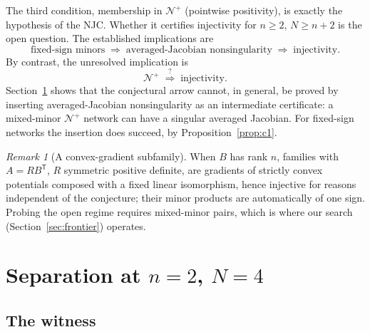 \documentclass[11pt]{article}
\theoremstyle{definition}
\theoremstyle{remark}
\newtheorem{remark}[theorem]{Remark}
\begin{document}
The third condition, membership in $\mathcal N^{+}$ (pointwise
positivity), is exactly the hypothesis of the NJC. Whether it certifies
injectivity for $n\ge2$, $N\ge n+2$ is the open question. The established
implications are
\[
\text{fixed-sign minors}
\;\Longrightarrow\;
\text{averaged-Jacobian nonsingularity}
\;\Longrightarrow\;
\text{injectivity}.
\]
By contrast, the unresolved implication is
\[
\mathcal N^{+}\;\overset{?}{\Longrightarrow}\;\text{injectivity}.
\]
Section~\ref{sec:witness} shows that the conjectural arrow cannot, in
general, be proved by inserting averaged-Jacobian nonsingularity as an
intermediate certificate: a mixed-minor $\mathcal N^{+}$ network can have
a singular averaged Jacobian. For fixed-sign networks the insertion does
succeed, by Proposition~\ref{prop:c1}.

\begin{remark}[A convex-gradient subfamily]\label{rem:gradient}
When $B$ has rank $n$, families with $A=RB^{\mathsf T}$, $R$ symmetric
positive definite, are
gradients of strictly convex potentials composed with a fixed linear
isomorphism, hence injective for reasons independent of the conjecture;
their minor products are automatically of one sign. Probing the open
regime requires mixed-minor pairs, which is where our search
(Section~\ref{sec:frontier}) operates.
\end{remark}

\section{Separation at \texorpdfstring{$n=2$, $N=4$}{n=2, N=4}}
\label{sec:witness}

\subsection{The witness}
\end{document}
